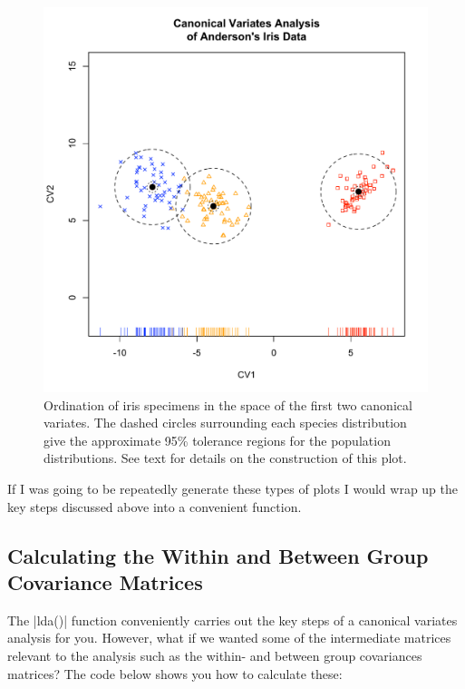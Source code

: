 \begin{figure}
\begin{center}
\includegraphics[height=0.8\columnwidth]{iris-cva-fancy}
\end{center}
\caption{Ordination of iris specimens in the space of the first two canonical variates.  The dashed circles surrounding each species distribution give the approximate 95\% tolerance regions for the population distributions. See text for details on the construction of this plot.}
\end{figure}

If I was going to be repeatedly generate these types of plots I would wrap up the key steps discussed above into a convenient function.


\subsection{Calculating the Within and Between Group Covariance Matrices}

The |lda()| function conveniently carries out the key steps of a canonical variates analysis for you.  However, what if we wanted some of the intermediate matrices relevant to the analysis such as the within- and between group covariances matrices? The code below shows you how to calculate these:


